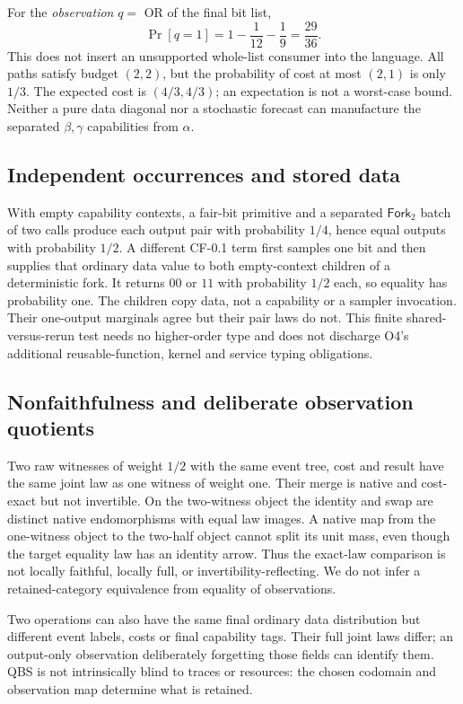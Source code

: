 \documentclass[11pt,a4paper]{article}
\theoremstyle{definition}
\begin{document}
For the \emph{observation} $q=$ OR of the final bit list,
\[
 \Pr[q=1]=1-\frac1{12}-\frac19=\frac{29}{36}.
\]
This does not insert an unsupported whole-list consumer into the language.
All paths satisfy budget $(2,2)$, but the probability of cost at most $(2,1)$
is only $1/3$. The expected cost is $(4/3,4/3)$; an expectation is not a
worst-case bound. Neither a pure data diagonal nor a stochastic forecast
can manufacture the separated $\beta,\gamma$ capabilities from
$\alpha$.

\subsection{Independent occurrences and stored data}
With empty capability contexts, a fair-bit primitive and a separated
$\mathsf{Fork}_2$ batch of two calls produce each output pair with
probability $1/4$, hence equal outputs with probability $1/2$.
A different CF-0.1 term first samples one bit and then supplies that ordinary
data value to both empty-context children of a deterministic fork. It
returns $00$ or $11$ with probability $1/2$ each, so equality has probability
one. The children copy data, not a capability or a sampler invocation.
Their one-output marginals agree but their pair laws do not. This finite
shared-versus-rerun test needs no higher-order type and does not discharge
O4's additional reusable-function, kernel and service typing obligations.

\subsection{Nonfaithfulness and deliberate observation quotients}
Two raw witnesses of weight $1/2$ with the same event tree, cost and result
have the same joint law as one witness of weight one. Their merge is native
and cost-exact but not invertible. On the two-witness object the identity
and swap are distinct native endomorphisms with equal law images. A native
map from the one-witness object to the two-half object cannot split its
unit mass, even though the target equality law has an identity arrow.
Thus the exact-law comparison is not locally faithful, locally full, or
invertibility-reflecting. We do not infer a retained-category equivalence
from equality of observations.

Two operations can also have the same final ordinary data distribution but
different event labels, costs or final capability tags. Their full joint
laws differ; an output-only observation deliberately forgetting those fields
can identify them. QBS is not intrinsically blind to traces or resources:
the chosen codomain and observation map determine what is retained.
\end{document}
